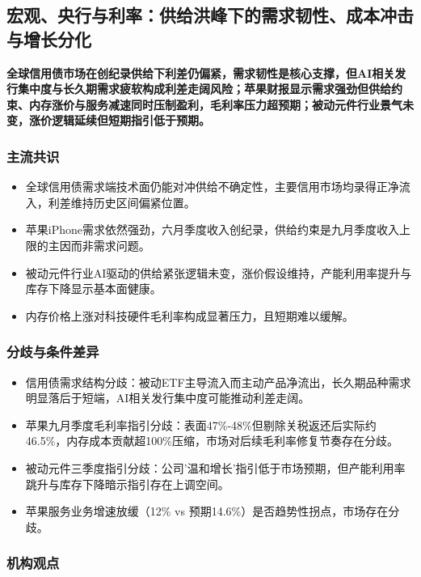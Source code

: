\documentclass[11pt]{ctexart}
\begin{document}
\subsection{宏观、央行与利率：供给洪峰下的需求韧性、成本冲击与增长分化}
\textbf{全球信用债市场在创纪录供给下利差仍偏紧，需求韧性是核心支撑，但AI相关发行集中度与长久期需求疲软构成利差走阔风险；苹果财报显示需求强劲但供给约束、内存涨价与服务减速同时压制盈利，毛利率压力超预期；被动元件行业景气未变，涨价逻辑延续但短期指引低于预期。}
\subsubsection*{主流共识}
\begin{itemize}
  \item 全球信用债需求端技术面仍能对冲供给不确定性，主要信用市场均录得正净流入，利差维持历史区间偏紧位置。
  \item 苹果iPhone需求依然强劲，六月季度收入创纪录，供给约束是九月季度收入上限的主因而非需求问题。
  \item 被动元件行业AI驱动的供给紧张逻辑未变，涨价假设维持，产能利用率提升与库存下降显示基本面健康。
  \item 内存价格上涨对科技硬件毛利率构成显著压力，且短期难以缓解。
\end{itemize}
\subsubsection*{分歧与条件差异}
\begin{itemize}
  \item 信用债需求结构分歧：被动ETF主导流入而主动产品净流出，长久期品种需求明显落后于短端，AI相关发行集中度可能推动利差走阔。
  \item 苹果九月季度毛利率指引分歧：表面47\%-48\%但剔除关税返还后实际约46.5\%，内存成本贡献超100\%压缩，市场对后续毛利率修复节奏存在分歧。
  \item 被动元件三季度指引分歧：公司'温和增长'指引低于市场预期，但产能利用率跳升与库存下降暗示指引存在上调空间。
  \item 苹果服务业务增速放缓（12\% vs 预期14.6\%）是否趋势性拐点，市场存在分歧。
\end{itemize}
\subsubsection*{机构观点}
\end{document}
